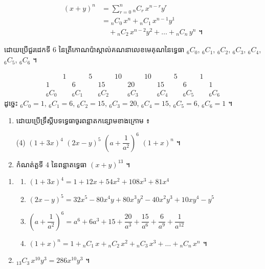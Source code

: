\begin{theorem}[ទ្រឹស្តីបទទ្វេធា]
\[
\begin{aligned}
(x + y)^n &= \sum_{r=0}^{n} {}_nC_r\,x^{n-r}y^r\\
&= {}_nC_0\,x^n + {}_nC_1\,x^{n-1}y^1\\
&\quad + {}_nC_2\,x^{n-2}y^2 + \ldots + {}_nC_n\,y^n \text{ ។}
\end{aligned}
\]
\end{theorem}

\begin{example}[លំហាត់គំរូ ៥]
ដោយប្រើជួរដេកទី $6$ នៃត្រីកោណប៉ាស្កាល់គណនាលេខមេគុណនៃទ្វេធា ${}_6C_0$, ${}_6C_1$, ${}_6C_2$, ${}_6C_3$, ${}_6C_4$, ${}_6C_5$, ${}_6C_6$ ។
\end{example}
\ans
\[
\begin{array}{ccccccccccccc}
 & 1 & & 5 & & 10 & & 10 & & 5 & & 1 & \\
1 & & 6 & & 15 & & 20 & & 15 & & 6 & & 1\\
{}_6C_0 & & {}_6C_1 & & {}_6C_2 & & {}_6C_3 & & {}_6C_4 & & {}_6C_5 & & {}_6C_6
\end{array}
\]
ដូច្នេះ ${}_6C_0 = 1$, ${}_6C_1 = 6$, ${}_6C_2 = 15$, ${}_6C_3 = 20$, ${}_6C_4 = 15$, ${}_6C_5 = 6$, ${}_6C_6 = 1$ ។

\begin{pro}
\begin{enumerate}[1]
  \item ដោយប្រើទ្រឹស្តីបទទ្វេធាចូរពន្លាតកន្សោមខាងក្រោម ៖
  \begin{tasks}(4)
    \task $(1 + 3x)^4$
    \task $(2x - y)^5$
    \task $\left(a + \dfrac{1}{a^2}\right)^6$
    \task $(1 + x)^n$ ។
  \end{tasks}
  \item កំណត់តួទី $4$ នៃពន្លាតទ្វេធា $(x + y)^{13}$ ។
\end{enumerate}
\ans
\begin{enumerate}[1]
  \item
  \begin{enumerate}[a]
    \item $(1 + 3x)^4 = 1 + 12x + 54x^2 + 108x^3 + 81x^4$
    \item $(2x - y)^5 = 32x^5 - 80x^4y + 80x^3y^2 - 40x^2y^3 + 10xy^4 - y^5$
    \item $\left(a + \dfrac{1}{a^2}\right)^6 = a^6 + 6a^3 + 15 + \dfrac{20}{a^3} + \dfrac{15}{a^6} + \dfrac{6}{a^9} + \dfrac{1}{a^{12}}$
    \item $(1 + x)^n = 1 + {}_nC_1\,x + {}_nC_2\,x^2 + {}_nC_3\,x^3 + \ldots + {}_nC_n\,x^n$ ។
  \end{enumerate}
  \item ${}_{13}C_3\,x^{10}y^3 = 286x^{10}y^3$ ។
\end{enumerate}
\end{pro}

